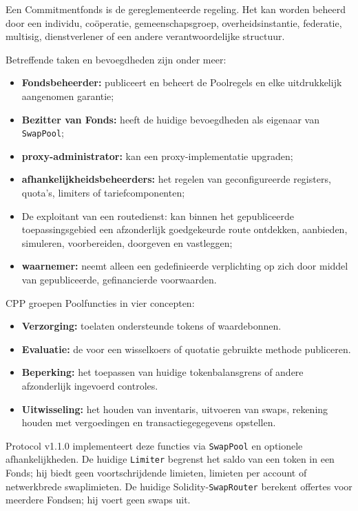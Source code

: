 \documentclass[11pt]{article}
\begin{document}
Een Commitmentfonds is de gereglementeerde regeling. Het kan worden beheerd door een individu, coöperatie, gemeenschapsgroep, overheidsinstantie, federatie, multisig, dienstverlener of een andere verantwoordelijke structuur.

Betreffende taken en bevoegdheden zijn onder meer:

\begin{itemize}[leftmargin=*]
\item \textbf{Fondsbeheerder:} publiceert en beheert de Poolregels en elke uitdrukkelijk aangenomen garantie;
\item \textbf{Bezitter van Fonds:} heeft de huidige bevoegdheden als eigenaar van \texttt{SwapPool};
\item \textbf{proxy-administrator:} kan een proxy-implementatie upgraden;
\item \textbf{afhankelijkheidsbeheerders:} het regelen van geconfigureerde registers, quota's, limiters of tariefcomponenten;
\item De exploitant van een routedienst: kan binnen het gepubliceerde toepassingsgebied een afzonderlijk goedgekeurde route ontdekken, aanbieden, simuleren, voorbereiden, doorgeven en vastleggen;
\item \textbf{waarnemer:} neemt alleen een gedefinieerde verplichting op zich door middel van gepubliceerde, gefinancierde voorwaarden.
\end{itemize}
CPP groepen Poolfuncties in vier concepten:

\begin{itemize}[leftmargin=*]
\item \textbf{Verzorging:} toelaten ondersteunde tokens of waardebonnen.
\item \textbf{Evaluatie:} de voor een wisselkoers of quotatie gebruikte methode publiceren.
\item \textbf{Beperking:} het toepassen van huidige tokenbalansgrens of andere afzonderlijk ingevoerd controles.
\item \textbf{Uitwisseling:} het houden van inventaris, uitvoeren van swaps, rekening houden met vergoedingen en transactiegegegevens opstellen.
\end{itemize}
Protocol v1.1.0 implementeert deze functies via \texttt{SwapPool} en optionele afhankelijkheden. De huidige \texttt{Limiter} begrenst het saldo van een token in een Fonds; hij biedt geen voortschrijdende limieten, limieten per account of netwerkbrede swaplimieten. De huidige Solidity-\texttt{SwapRouter} berekent offertes voor meerdere Fondsen; hij voert geen swaps uit.
\end{document}

